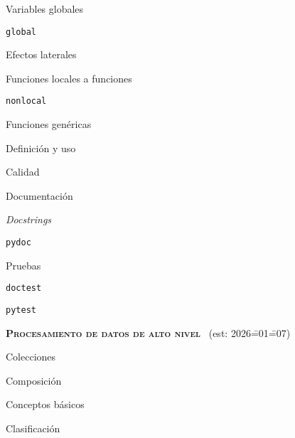 \begin{longenum}
\begin{longenum}
\begin{longenum}
\begin{longenum}
                \item Variables globales
                \begin{longenum}
                    \item \texttt{global}
                    \item Efectos laterales
                \end{longenum}
            \end{longenum}
            \item Funciones locales a funciones
            \begin{longenum}
                \item \texttt{nonlocal}
            \end{longenum}
        \end{longenum}
        \item Funciones genéricas
        \begin{longenum}
            \item Definición y uso
        \end{longenum}
        \item Calidad \opcional\
        \begin{longenum}
            \item Documentación
            \begin{longenum}
                \item \textit{Docstrings}
                \item \texttt{pydoc}
            \end{longenum}
            \item Pruebas
            \begin{longenum}
                \item \texttt{doctest}
                \item \texttt{pytest}
            \end{longenum}
        \end{longenum}
    \end{longenum}
    \item \textbf{\textsc{Procesamiento de datos de alto nivel}} \ev2\ (est: 2026\==01\==07)
    \begin{longenum}
        \item Colecciones
        \begin{longenum}
            \item Composición
            \item Conceptos básicos
            \item Clasificación

\end{longenum}
\end{longenum}
\end{longenum}
